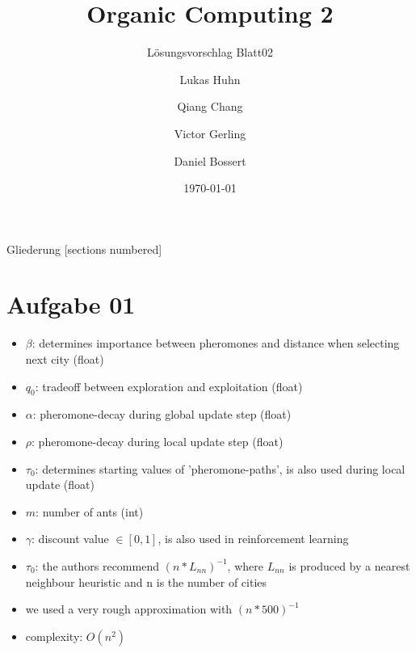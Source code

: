 \documentclass{ocbeameruni}
\title{Organic Computing 2}
\subtitle{Lösungsvorschlag Blatt02}
\date{\today}
\author{Lukas Huhn \and Qiang Chang \and Victor Gerling \and Daniel Bossert}
\institute{%
  Universität Augsburg\\
  Institut für Informatik\\
  Lehrstuhl für Organic Computing
}
\begin{document}
\maketitle


\begin{frame}{Gliederung}
  [sections numbered]
  \tableofcontents
\end{frame}


\section{Aufgabe 01}

\begin{frame}{1.1}
    \begin{itemize}
    \item $\beta$: determines importance between pheromones and distance when selecting next city (float)
    \item $q_0$: tradeoff between exploration and exploitation (float)
    \item $\alpha$: pheromone-decay during global update step (float)
    \item $\rho$: pheromone-decay during local update step (float)
    \item $\tau_{0}$: determines starting values of 'pheromone-paths', is also used during local update (float)
    \item $m$: number of ants (int)
    \end{itemize}
\end{frame}

\begin{frame}{1.2}
    \begin{itemize}
    \item $\gamma$: discount value $\in [0,1]$, is also used in reinforcement learning
    \end{itemize}
\end{frame}

\begin{frame}{1.3}
    \begin{itemize}
    \item $\tau_{0}$: the authors recommend $(n * L_{nn})^{-1}$, where $L_{nn}$ is produced by a nearest neighbour heuristic and n is the number of cities
    \item we used a very rough approximation with $(n * 500)^{-1}$
    \item complexity: $O(n^2)$
    \end{itemize}
\end{frame}
\end{document}
